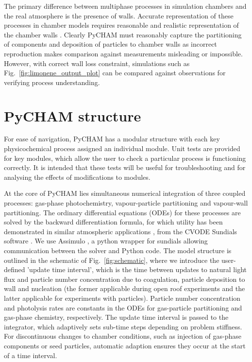 \documentclass[gmd, manuscript]{copernicus}
\begin{document}
The primary difference between multiphase processes in simulation chambers and the real atmosphere is the presence of walls.  Accurate representation of these processes in chamber models requires reasonable and realistic representation of the chamber walls \citep[e.g][]{Matsunaga2010, Zhang2015b}.  Clearly PyCHAM must reasonably capture the partitioning of components and deposition of particles to chamber walls as incorrect reproduction makes comparison against measurements misleading or impossible.  However, with correct wall loss constraint, simulations such as Fig.~\ref{fig:limonene_output_plot} can be compared against observations for verifying process understanding.

\section{PyCHAM structure}\label{sec:general}

For ease of navigation, PyCHAM has a modular structure with each key physicochemical process assigned an individual module.  Unit tests are provided for key modules, which allow the user to check a particular process is functioning correctly.  It is intended that these tests will be useful for troubleshooting and for analysing the effects of modifications to modules.
  
At the core of PyCHAM lies simultaneous numerical integration of three coupled processes: gas-phase photochemistry, vapour-particle partitioning and vapour-wall partitioning.  The ordinary differential equations (ODEs) for these processes are solved by the backward differentiation formula, for which utility has been demonstrated in similar atmospheric applications \citep{Jacobson2005}, from the CVODE Sundials software \citep{hindmarsh2005sundials}.  We use Assimulo \citep{Andersson2015}, a python wrapper for sundials allowing communication between the solver and Python code.  The model structure is outlined in the schematic of Fig.~\ref{fig:schematic}, where we introduce the user-defined 'update time interval', which is the time between updates to natural light flux and particle number concentration due to coagulation, particle deposition to wall and nucleation (the former applicable during open roof experiments and the latter applicable for experiments with particles).  Particle number concentration and photolysis rates are constants in the ODEs for gas-particle partitioning and gas-phase chemistry, respectively.  The update time interval is passed to the integrator, which adaptively sets sub-time steps depending on problem stiffness.  For discontinuous changes to chamber conditions, such as injection of gas-phase components or seed particles, automatic adaption ensures they occur at the start of a time interval.  
\end{document}
